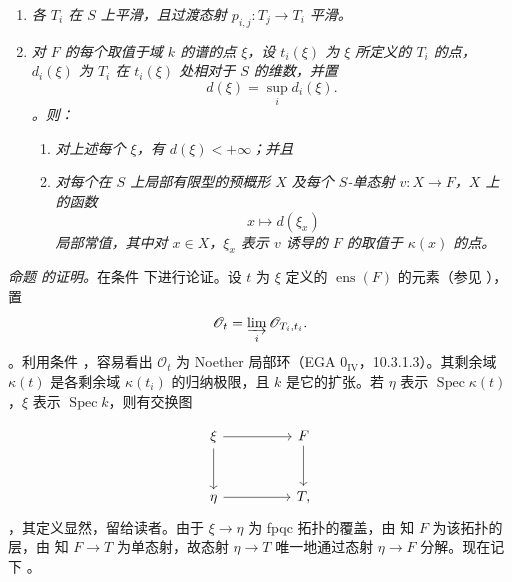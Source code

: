 \begin{enumerate}\item[\(c'\)]\textit{各 \(T_i\) 在 \(S\) 上平滑，且过渡态射 \(p_{i,j}:T_j\to T_i\) 平滑。}

\item[\(d'\)]\textit{对 \(F\) 的每个取值于域 \(k\) 的谱的点 \(\xi\)，设 \(t_i(\xi)\) 为 \(\xi\) 所定义的 \(T_i\) 的点，\(d_i(\xi)\) 为 \(T_i\) 在 \(t_i(\xi)\) 处相对于 \(S\) 的维数，并置 \[
  d(\xi)=\sup_i d_i(\xi).
\]。则：}\begin{enumerate}\item[\(1^\circ\)]\textit{对上述每个 \(\xi\)，有 \(d(\xi)<+\infty\)；并且}

\item[\(2^\circ\)]\textit{对每个在 \(S\) 上局部有限型的预概形 \(X\) 及每个 \(S\)-单态射 \(v:X\to F\)，\(X\) 上的函数 \[
    x\longmapsto d(\xi_x)
  \] 局部常值，其中对 \(x\in X\)，\(\xi_x\) 表示 \(v\) 诱导的 \(F\) 的取值于 \(\kappa(x)\) 的点。}\end{enumerate}\end{enumerate}

\smallskip\noindent\emph{命题  的证明。}在条件  下进行论证。设 \(t\) 为 \(\xi\) 定义的 \(\operatorname{ens}(F)\) 的元素（参见 ），置  \[
  \mathscr O_t=\varinjlim_i\mathscr O_{T_i,t_i}.
\]。利用条件 ，容易看出 \(\mathscr O_t\) 为 Noether 局部环（EGA \(0_{\mathrm{IV}}\)，10.3.1.3）。其剩余域 \(\kappa(t)\) 是各剩余域 \(\kappa(t_i)\) 的归纳极限，且 \(k\) 是它的扩张。若 \(\eta\) 表示 \(\operatorname{Spec}\kappa(t)\)，\(\xi\) 表示 \(\operatorname{Spec}k\)，则有交换图

 \[
\begin{tikzcd}[column sep=huge,row sep=large]
  \xi \arrow[r] \arrow[d] & F \arrow[d] \\
  \eta \arrow[r] & T ,
\end{tikzcd}
\]，其定义显然，留给读者。由于 \(\xi\to\eta\) 为 fpqc 拓扑的覆盖，由  知 \(F\) 为该拓扑的层，由  知 \(F\to T\) 为单态射，故态射 \(\eta\to T\) 唯一地通过态射 \(\eta\to F\) 分解。现在记下 。

